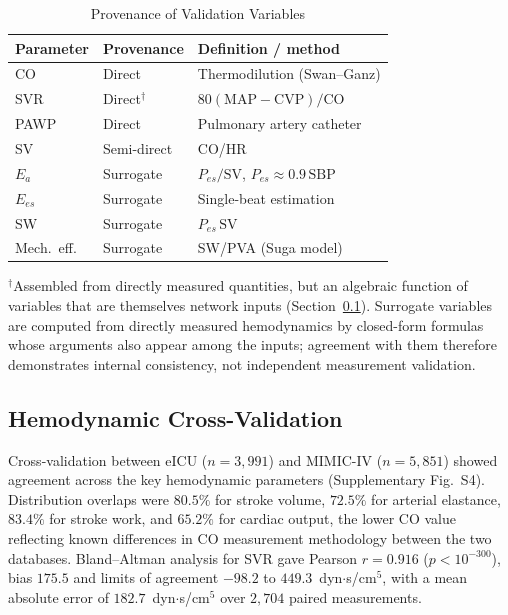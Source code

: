 \documentclass[journal]{IEEEtran}
\begin{document}
\begin{table}[!t]
\caption{Provenance of Validation Variables}
\label{tab:prov}
\centering
\footnotesize
\begin{tabular}{lll}
\hline
\textbf{Parameter} & \textbf{Provenance} & \textbf{Definition / method}\\
\hline
CO & Direct & Thermodilution (Swan--Ganz)\\
SVR & Direct$^\dagger$ & $80(\text{MAP}-\text{CVP})/\text{CO}$\\
PAWP & Direct & Pulmonary artery catheter\\
SV & Semi-direct & CO/HR\\
$E_a$ & Surrogate & $P_{es}/\text{SV}$, $P_{es}\approx0.9\,\text{SBP}$\\
$E_{es}$ & Surrogate & Single-beat estimation \cite{chen2001}\\
SW & Surrogate & $P_{es}\,\text{SV}$\\
Mech.\ eff. & Surrogate & SW/PVA (Suga model) \cite{suga1974}\\
\hline
\end{tabular}

\vspace{2pt}
\begin{minipage}{\columnwidth}
\footnotesize $^\dagger$Assembled from directly measured quantities, but an algebraic function of variables that are themselves network inputs (Section~\ref{sec:xval}). Surrogate variables are computed from directly measured hemodynamics by closed-form formulas whose arguments also appear among the inputs; agreement with them therefore demonstrates internal consistency, not independent measurement validation.
\end{minipage}
\end{table}


\subsection{Hemodynamic Cross-Validation}\label{sec:xval}
Cross-validation between eICU ($n=3{,}991$) and MIMIC-IV ($n=5{,}851$) showed agreement across the key hemodynamic parameters (Supplementary Fig.~S4). Distribution overlaps were $80.5\%$ for stroke volume, $72.5\%$ for arterial elastance, $83.4\%$ for stroke work, and $65.2\%$ for cardiac output, the lower CO value reflecting known differences in CO measurement methodology between the two databases. Bland--Altman analysis \cite{blandaltman1986} for SVR gave Pearson $r=0.916$ ($p<10^{-300}$), bias $175.5$ and limits of agreement $-98.2$ to $449.3$~dyn$\cdot$s/cm$^{5}$, with a mean absolute error of $182.7$~dyn$\cdot$s/cm$^{5}$ over $2{,}704$ paired measurements.
\end{document}
